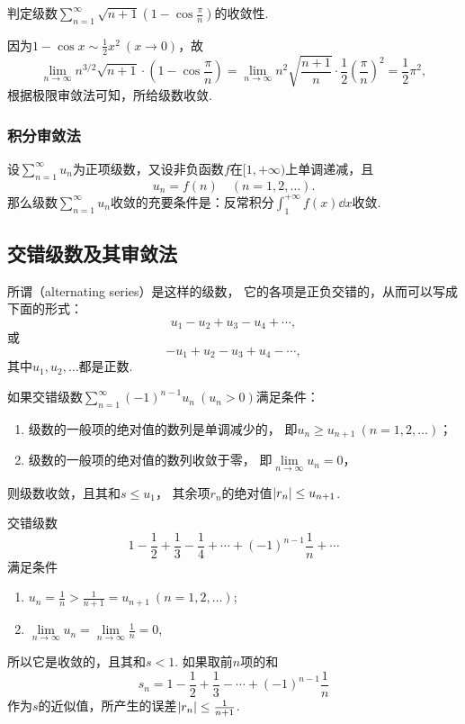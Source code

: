 \begin{example}
判定级数\(\sum\limits_{n=1}^\infty \sqrt{n+1} \left(1-\cos\frac{\pi}{n}\right)\)的收敛性.
\begin{solution}
因为\(1 - \cos x \sim \frac{1}{2} x^2\ (x\to0)\)，故\[
\lim\limits_{n\to\infty} n^{3/2} \sqrt{n+1} \cdot \left(1-\cos\frac{\pi}{n}\right)
= \lim\limits_{n\to\infty} n^2 \sqrt{\frac{n+1}{n}} \cdot \frac{1}{2} \left(\frac{\pi}{n}\right)^2
= \frac{1}{2} \pi^2,
\]根据极限审敛法可知，所给级数收敛.
\end{solution}
\end{example}

\subsubsection{积分审敛法}
\begin{theorem}[积分审敛法]\label{theorem:无穷级数.积分审敛法}
设\(\sum\limits_{n=1}^\infty u_n\)为正项级数，又设非负函数\(f\)在\([1,+\infty)\)上单调递减，且\[
u_n = f(n)
\quad(n=1,2,\dotsc).
\]那么级数\(\sum\limits_{n=1}^\infty u_n\)收敛的充要条件是：反常积分\(\int_1^{+\infty} f(x) \dd{x}\)收敛.
\end{theorem}

\subsection{交错级数及其审敛法}
所谓（alternating series）是这样的级数，
它的各项是正负交错的，从而可以写成下面的形式：\[
u_1 - u_2 + u_3 - u_4 + \dotsb,
\]或\[
-u_1 + u_2 - u_3 + u_4 - \dotsb,
\]其中\(u_1,u_2,\dotsc\)都是正数.

\begin{theorem}[莱布尼茨定理]\label{theorem:无穷级数.莱布尼茨定理}
如果交错级数\(\sum\limits_{n=1}^\infty (-1)^{n-1} u_n\ (u_n>0)\)满足条件：
\begin{enumerate}
\item 级数的一般项的绝对值的数列是单调减少的，
即\(u_n \geq u_{n+1}\ (n=1,2,\dotsc)\)；

\item 级数的一般项的绝对值的数列收敛于零，
即\(\lim\limits_{n\to\infty} {u_n}=0\)，
\end{enumerate}
则级数收敛，且其和\(s \leq u_1\)，
其余项\(r_n\)的绝对值\(\abs{r_n} \leq u_{n+1}\).
\end{theorem}

\begin{example}\label{example:无穷级数.交错级数1}
交错级数\[
1 - \frac{1}{2} + \frac{1}{3} - \frac{1}{4} + \dotsb + (-1)^{n-1} \frac{1}{n} + \dotsb
\]满足条件\begin{enumerate}
\item \(u_n = \frac{1}{n} > \frac{1}{n+1} = u_{n+1}\ (n=1,2,\dotsc)\);
\item \(\lim\limits_{n\to\infty} u_n = \lim\limits_{n\to\infty} \frac{1}{n} = 0\),
\end{enumerate}所以它是收敛的，且其和\(s < 1\).
如果取前\(n\)项的和\[
s_n = 1 - \frac{1}{2} + \frac{1}{3} - \dotsb + (-1)^{n-1} \frac{1}{n}
\]作为\(s\)的近似值，所产生的误差\(\abs{r_n} \leq \frac{1}{n+1}\).
\end{example}


